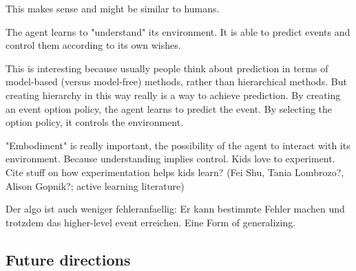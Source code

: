 \documentclass{article}
\begin{document}
This makes sense and might be similar to humans.

The agent learns to "understand" its environment. It is able to predict events and control them according to its own wishes.

This is interesting because usually people think about prediction in terms of model-based (versus model-free) methods, rather than hierarchical methods. But creating hierarchy in this way really is a way to achieve prediction. By creating an event option policy, the agent learns to predict the event. By selecting the option policy, it controls the environment.

"Embodiment" is really important, the possibility of the agent to interact with its environment. Because understanding implies control. Kids love to experiment. Cite stuff on how experimentation helps kids learn? (Fei Shu, Tania Lombrozo?, Alison Gopnik?; active learning literature)

Der algo ist auch weniger fehleranfaellig: Er kann bestimmte Fehler machen und trotzdem das higher-level event erreichen. Eine Form of generalizing.


\subsection{Future directions}
\end{document}
